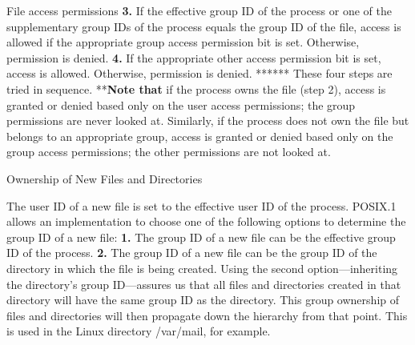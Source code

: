 \documentclass{beamer}
\begin{document}
\begin{frame}[t]{File access permissions}
\textbf{3.} If the effective group ID of the process or one of the supplementary group IDs of
the process equals the group ID of the file, access is allowed if the appropriate
group access permission bit is set. Otherwise, permission is denied.
\textbf{4.} If the appropriate other access permission bit is set, access is allowed.
Otherwise, permission is denied.
\******* These four steps are tried in sequence. \***\textbf{Note that} if the process owns the file
(step 2), access is granted or denied based only on the user access permissions; the
group permissions are never looked at. Similarly, if the process does not own the file
but belongs to an appropriate group, access is granted or denied based only on the
group access permissions; the other permissions are not looked at. 
 





\end{frame}
\begin{frame}[t]{Ownership of New Files and Directories}

The user ID of a new file is set to the effective user ID of the process. POSIX.1
allows an implementation to choose one of the following options to determine the
group ID of a new file:
\textbf{1.} The group ID of a new file can be the effective group ID of the process.
\textbf{2.} The group ID of a new file can be the group ID of the directory in which the file
is being created.
Using the second option—inheriting the directory’s group ID—assures us that all
files and directories created in that directory will have the same group ID as the
directory. This group ownership of files and directories will then propagate down the
hierarchy from that point. This is used in the Linux directory /var/mail, for example.



\end{frame}
\end{document}
